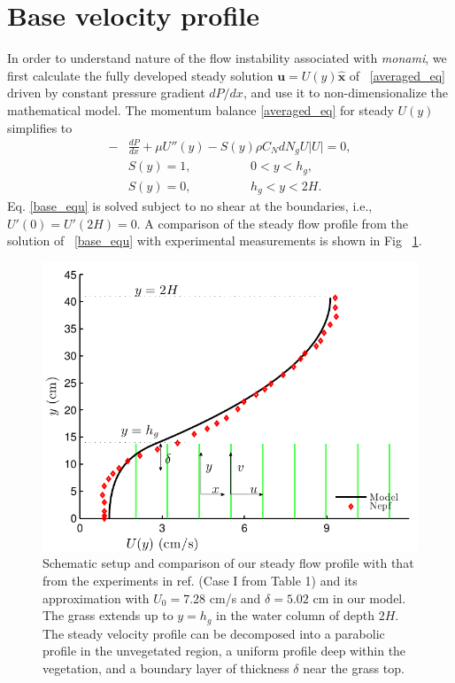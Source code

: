 \documentclass[12pt]{report}   %
\newcommand{\bu}{\mathbf{u}}
\newcommand{\hg}{h_g}
\newcommand{\monami}{\textit{monami}}
\begin{document}
\section{Base velocity profile}
In order to understand nature of the flow instability associated with \monami, we first calculate the fully developed steady solution $\bu = U(y)\boldsymbol{\hat{x}}$ of ~\eqref{averaged_eq} driven by constant pressure gradient $dP/dx$, and use it to non-dimensionalize the mathematical model. The momentum balance \eqref{averaged_eq} for steady $U(y)$ simplifies to
\begin{equation}
\begin{split}
 -&\frac{dP}{dx}+\mu U''(y) -S(y) \rho C_N d N_gU |U| =0,\\
 &S(y) = 1, \hspace{2cm} 0<y<\hg,\\
 &S(y) = 0, \hspace{2cm} \hg< y< 2H.
\label{base_equ}
\end{split}
\end{equation}
Eq. \eqref{base_equ} is solved subject to no shear at the boundaries, i.e., $U'(0) = U'(2H) = 0$.
A comparison of the steady flow profile from the solution of ~\eqref{base_equ} with experimental measurements is shown in Fig ~\ref{basicflow}.
\begin{figure}
\centerline{\includegraphics[scale=.99]{Grass_Base_Nepf} }
\caption{
Schematic setup and comparison of our steady flow profile with that from the experiments in ref. \cite{Nepf04} (Case I from Table 1) %
 and its approximation with $U_0=7.28$ cm/s and $\delta = 5.02$ cm in our model. The grass extends up to $y=\hg$ in the water column of depth $2H$. 
The steady velocity profile can be decomposed into a parabolic profile in the unvegetated region, a uniform profile deep within the vegetation, and a boundary layer of thickness $\delta$ near the grass top. 
}
\label{basicflow}
\end{figure}
\end{document}
